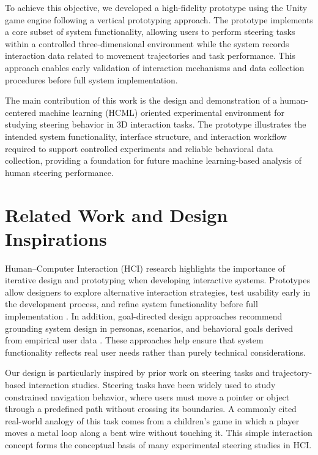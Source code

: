 \documentclass[sigconf]{acmart}
\begin{document}
To achieve this objective, we developed a high-fidelity prototype using the Unity game engine following a vertical prototyping approach. The prototype implements a core subset of system functionality, allowing users to perform steering tasks within a controlled three-dimensional environment while the system records interaction data related to movement trajectories and task performance. This approach enables early validation of interaction mechanisms and data collection procedures before full system implementation.

The main contribution of this work is the design and demonstration of a human-centered machine learning (HCML) oriented experimental environment for studying steering behavior in 3D interaction tasks. The prototype illustrates the intended system functionality, interface structure, and interaction workflow required to support controlled experiments and reliable behavioral data collection, providing a foundation for future machine learning-based analysis of human steering performance.


\section{Related Work and Design Inspirations}

Human–Computer Interaction (HCI) research highlights the importance of iterative design and prototyping when developing interactive systems. Prototypes allow designers to explore alternative interaction strategies, test usability early in the development process, and refine system functionality before full implementation \cite{sharp2019interaction}. In addition, goal-directed design approaches recommend grounding system design in personas, scenarios, and behavioral goals derived from empirical user data \cite{cooper2014aboutface}. These approaches help ensure that system functionality reflects real user needs rather than purely technical considerations.

Our design is particularly inspired by prior work on steering tasks and trajectory-based interaction studies. Steering tasks have been widely used to study constrained navigation behavior, where users must move a pointer or object through a predefined path without crossing its boundaries. A commonly cited real-world analogy of this task comes from a children's game in which a player moves a metal loop along a bent wire without touching it. This simple interaction concept forms the conceptual basis of many experimental steering studies in HCI.
\end{document}
